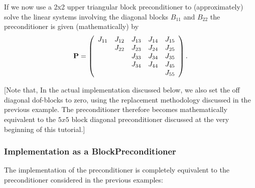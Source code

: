 If we now use a 2x2 upper triangular block preconditioner to (approximately) solve the linear systems involving the diagonal blocks $ B_{11} $ and $ B_{22} $ the preconditioner is given (mathematically) by \[ {\bf P} = \left( \begin{array}{ccccc} J_{11} & J_{12} & J_{13} & J_{14} & J_{15} \\ & J_{22} & J_{23} & J_{24} & J_{25} \\ & & J_{33} & J_{34} & J_{35} \\ & & J_{34} & J_{44} & J_{45} \\ & & & & J_{55} \\ \end{array} \right). \]

\mbox{[}Note that, In the actual implementation discussed below, we also set the off diagonal dof-\/blocks to zero, using the replacement methodology discussed in the previous example. The preconditioner therefore becomes mathematically equivalent to the $ 5x5 $ block diagonal preconditioner discussed at the very beginning of this tutorial.\mbox{]}\hypertarget{index_coarse_two_plus_two_plus_one_implementation}{}\subsubsection{Implementation as a Block\+Preconditioner}\label{index_coarse_two_plus_two_plus_one_implementation}
The implementation of the preconditioner is completely equivalent to the preconditioner considered in the previous examples\+:


